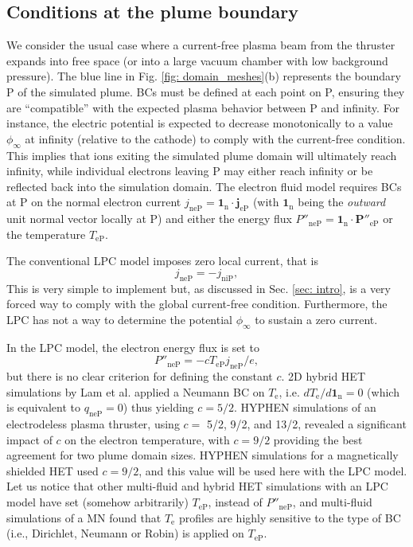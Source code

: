 \documentclass[%
 aip,
cha,
 amsmath,amssymb,
 reprint,%
]{revtex4-1}
\begin{document}
\subsection{Conditions at the plume boundary}\label{sec: GDML}

We consider the usual case where a current-free plasma beam from the thruster expands into free space (or into a large vacuum chamber with low background pressure). The blue line in Fig. \ref{fig: domain_meshes}(b) represents the boundary P of the simulated plume. BCs must be defined at each point on P, ensuring they are ``compatible'' with the expected plasma behavior between P and infinity.  For instance, the electric potential is expected to decrease monotonically to a value $\phi_\infty$ at infinity (relative to the cathode)  to comply with the current-free condition. This implies that ions exiting the simulated plume domain will ultimately reach infinity, while individual electrons leaving P may either reach infinity or be reflected back into the simulation domain. The electron fluid model requires BCs at P on the normal electron current  $j_\mathrm{neP} = \bm 1_\mathrm{n} \cdot \bm j_\mathrm{eP}$ (with $\bm 1_\mathrm{n}$ being the {\it outward} unit normal vector locally at P) and either the energy flux $P''_\mathrm{neP} =  \bm 1_\mathrm{n} \cdot \bm{P}''_\mathrm{eP}$ or the temperature $T_\mathrm{eP}$.

%
The conventional LPC model imposes zero local current, that is
%
\begin{equation}
j_\mathrm{neP} = -j_\mathrm{niP},
\label{eq: jneP local}
\end{equation}
This is very simple to implement but, as discussed in Sec. \ref{sec: intro}, is a very forced way to comply with the global current-free condition. Furthermore, the LPC has not a way to determine the potential $\phi_\infty$ to sustain a zero current.


In the LPC model, the electron energy flux is set to
\begin{equation}
    P''_\mathrm{neP} = -cT_\mathrm{eP}j_\mathrm{neP}/e,
    \label{eq: PneP local}
\end{equation}
but there is no clear criterion for defining the  constant $c$.
2D hybrid HET simulations by Lam et al. \cite{lam15} applied a Neumann BC on $T_\mathrm{e}$, i.e.  $dT_\mathrm{e}/d\bm{1}_\mathrm{n} = 0$ (which is equivalent to $q_\mathrm{neP} = 0$) thus yielding $c = 5/2$.
HYPHEN simulations of an electrodeless plasma thruster\cite{zhou22a}, using $c =$ 5/2, 9/2, and 13/2, revealed a significant impact of $c$ on the electron temperature, with $c = 9/2$ providing the best agreement for two plume domain sizes.
HYPHEN simulations for a magnetically shielded HET\cite{pera22b} used $c = 9/2$, and this value will be used here with the LPC model.
Let us notice that other multi-fluid \cite{mike09,mike12b} and hybrid \cite{kubo17,parr06a} HET simulations with an LPC model have set (somehow arbitrarily) $T_\mathrm{eP}$, instead of $P''_\mathrm{neP}$, and multi-fluid simulations of a MN \cite{mark20a} found that $T_\mathrm{e}$ profiles are highly sensitive to the type of BC (i.e., Dirichlet, Neumann or Robin) is applied on $T_\mathrm{eP}$.
\end{document}
